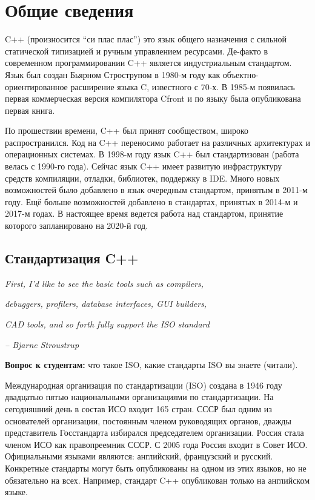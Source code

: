 \documentclass[a4paper,12pt,oneside]{article}
\begin{document}
\pagebreak
\section{Общие сведения}\label{StdIntroduction}

C++ (произносится ``си плас плас'') это язык общего назначения с сильной статической типизацией и ручным управлением ресурсами. Де-факто в современном программировании C++ является индустриальным стандартом. Язык был создан Бьярном Строструпом в 1980-м году как объектно-ориентированное расширение языка C, известного с 70-х. В 1985-м появилась первая коммерческая версия компилятора Cfront и по языку была опубликована первая книга. 

По прошествии времени, C++ был принят сообществом, широко распространился. Код на C++ переносимо работает на различных архитектурах и операционных системах. В 1998-м году язык C++ был стандартизован (работа велась с 1990-го года). Сейчас язык C++ имеет развитую инфраструктуру средств компиляции, отладки, библиотек, поддержку в IDE. Много новых возможностей было добавлено в язык очередным стандартом, принятым в 2011-м году. Ещё больше возможностей добавлено в стандартах, принятых в 2014-м и 2017-м годах. В настоящее время ведется работа над стандартом, принятие которого запланировано на 2020-й год.

\subsection{Стандартизация C++}\label{Standartization}

\hfill\textit{First, I'd like to see the basic tools such as compilers,}

\hfill\textit{debuggers, profilers, database interfaces, GUI builders,} 

\hfill\textit{CAD tools, and so forth fully support the ISO standard}{\vspace{0.5em}}

\hfill\textit{-- Bjarne Stroustrup}

\textbf{Вопрос к студентам:} что такое ISO, какие стандарты ISO вы знаете (читали).

Международная организация по стандартизации (ISO) создана в 1946 году двадцатью пятью национальными организациями по стандартизации. На сегодняшний день в состав ИСО входит 165 стран. СССР был одним из основателей организации, постоянным членом руководящих органов, дважды представитель Госстандарта избирался председателем организации. Россия стала членом ИСО как правопреемник СССР. С 2005 года Россия входит в Совет ИСО. Официальными языками являются: английский, французский и русский. Конкретные стандарты могут быть опубликованы на одном из этих языков, но не обязательно на всех. Например, стандарт C++ опубликован только на английском языке.
\end{document}
